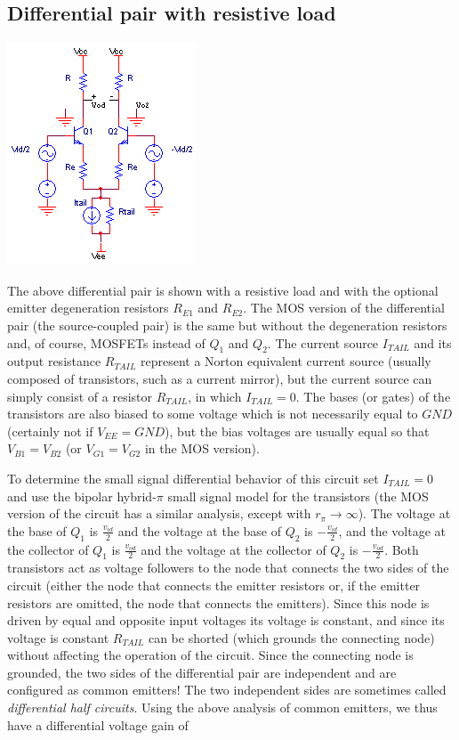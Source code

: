 \subsection{Differential pair with resistive load}
\begin{center}
	\includegraphics{schematics/differentialpair_resistorload.PNG}
\end{center}

The above differential pair is shown with a resistive load and with the optional emitter degeneration resistors $R_{E1}$ and $R_{E2}$.
The MOS version of the differential pair (the source-coupled pair) is the same but without the degeneration resistors and, of course, MOSFETs instead of $Q_{1}$ and $Q_{2}$.
The current source $I_{TAIL}$ and its output resistance $R_{TAIL}$ represent a Norton equivalent current source (usually composed of transistors, such as a current mirror), but the current source can simply consist of a resistor $R_{TAIL}$, in which $I_{TAIL} = 0$.
The bases (or gates) of the transistors are also biased to some voltage which is not necessarily equal to $GND$ (certainly not if $V_{EE} = GND$), but the bias voltages are usually equal so that $V_{B1} = V_{B2}$ (or $V_{G1} = V_{G2}$ in the MOS version).

To determine the small signal differential behavior of this circuit set $I_{TAIL} = 0$ and use the bipolar hybrid-$\pi$ small signal model for the transistors (the MOS version of the circuit has a similar analysis, except with $r_{\pi} \to \infty$).
The voltage at the base of $Q_{1}$ is $\frac{v_{id}}{2}$ and the voltage at the base of $Q_{2}$ is $-\frac{v_{id}}{2}$, and the voltage at the collector of $Q_{1}$ is $\frac{v_{od}}{2}$ and the voltage at the collector of $Q_{2}$ is $-\frac{v_{od}}{2}$.
Both transistors act as voltage followers to the node that connects the two sides of the circuit (either the node that connects the emitter resistors or, if the emitter resistors are omitted, the node that connects the emitters).
Since this node is driven by equal and opposite input voltages its voltage is constant, and since its voltage is constant $R_{TAIL}$ can be shorted (which grounds the connecting node) without affecting the operation of the circuit. \autocite[226]{analysis-design-analog-ics}
Since the connecting node is grounded, the two sides of the differential pair are independent and are configured as common emitters!
The two independent sides are sometimes called \textit{differential half circuits}.
Using the above analysis of common emitters, we thus have a differential voltage gain of

